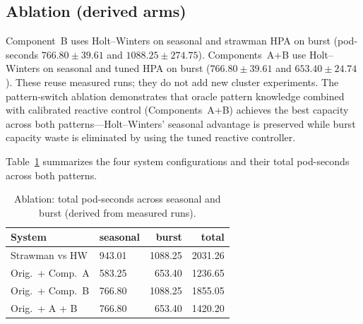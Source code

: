 \documentclass[journal]{IEEEtran}
\begin{document}
\begin{table}[!t]
\caption{Held-out forecasting (GBDT best MAE; WAPE in percent).}
\label{tab:rw}
\centering
\footnotesize
{}
\end{table}

\subsection{Ablation (derived arms)}
Component~B uses Holt--Winters on seasonal and strawman HPA on burst (pod-seconds $766.80 \pm 39.61$ and $1088.25 \pm 274.75$). Components~A+B use Holt--Winters on seasonal and tuned HPA on burst ($766.80 \pm 39.61$ and $653.40 \pm 24.74$). These reuse measured runs; they do not add new cluster experiments. The pattern-switch ablation demonstrates that oracle pattern knowledge combined with calibrated reactive control (Components~A+B) achieves the best capacity across both patterns---Holt--Winters' seasonal advantage is preserved while burst capacity waste is eliminated by using the tuned reactive controller.

Table~\ref{tab:ablation} summarizes the four system configurations and their total pod-seconds across both patterns.

\begin{table}[!t]
\caption{Ablation: total pod-seconds across seasonal and burst (derived from measured runs).}
\label{tab:ablation}
\centering
\footnotesize
\begin{tabular}{@{}llrr@{}}
\toprule
System & seasonal & burst & total \\
\midrule
Strawman vs HW & 943.01 & 1088.25 & 2031.26 \\
Orig.\ + Comp.~A & 583.25 & 653.40 & 1236.65 \\
Orig.\ + Comp.~B & 766.80 & 1088.25 & 1855.05 \\
Orig.\ + A + B & 766.80 & 653.40 & 1420.20 \\
\bottomrule
\end{tabular}
\end{table}
\end{document}
